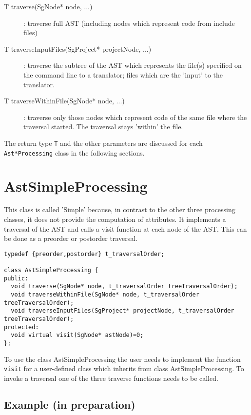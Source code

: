 \begin{description}
\item[T traverse(SgNode* node, ...)] : traverse full AST (including nodes which represent code from include files)
\item[T traverseInputFiles(SgProject* projectNode, ...)] : traverse the subtree of the AST which represents the file(s) specified on the command line to a translator; files which are the 'input' to the translator.
\item[T traverseWithinFile(SgNode* node, ...)] : traverse only those nodes which represent code of the same file where the traversal started. The traversal stays 'within' the file.
\end{description}

The return type {\tt T} and the other parameters are discussed for each {\tt Ast*Processing} class in the following sections.

\section{AstSimpleProcessing}
\label{AstProcessing:AstSimpleProcessing}

This class is called 'Simple' because, in contrast to the other three
processing classes, it does not provide the computation of
attributes. It implements a traversal of the AST and calls a
visit function at each node of the AST. This can be done as
a preorder or postorder traversal.

\begin{verbatim}
typedef {preorder,postorder} t_traversalOrder;

class AstSimpleProcessing {
public:
  void traverse(SgNode* node, t_traversalOrder treeTraversalOrder);
  void traverseWithinFile(SgNode* node, t_traversalOrder treeTraversalOrder);
  void traverseInputFiles(SgProject* projectNode, t_traversalOrder treeTraversalOrder);
protected:
  void virtual visit(SgNode* astNode)=0;
};
\end{verbatim}

To use the class AstSimpleProcessing the user needs to implement the
function {\tt visit} for a user-defined class which inherits
from class AstSimpleProcessing. To invoke a traversal one of the three
traverse functions needs to be called.

\subsection{Example (in preparation)}

